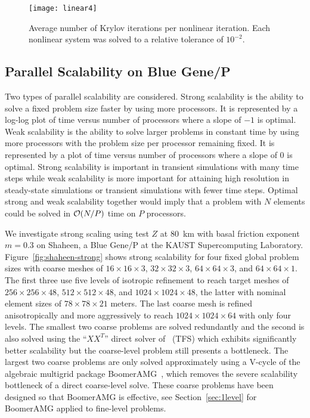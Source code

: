 \begin{figure}
  \centering\texttt{[image: linear4]}
  \caption{Average number of Krylov iterations per nonlinear iteration.  Each nonlinear system was solved to a relative tolerance of $10^{-2}$.}\label{fig:linear}
\end{figure}

\subsection{Parallel Scalability on Blue Gene/P}\label{sec:pscaling}
Two types of parallel scalability are considered.
Strong scalability is the ability to solve a fixed problem size faster by using more processors.
It is represented by a log-log plot of time versus number of processors where a slope of $-1$ is optimal.
Weak scalability is the ability to solve larger problems in constant time by using more processors with the problem size per processor remaining fixed.
It is represented by a plot of time versus number of processors where a slope of $0$ is optimal.
Strong scalability is important in transient simulations with many time steps while weak scalability is more important for attaining high resolution in steady-state simulations or transient simulations with fewer time steps.
Optimal strong and weak scalability together would imply that a problem with $N$ elements could be solved in ${\mathcal{O}}(N/P)$ time on $P$ processors.

We investigate strong scaling using test $Z$ at \SI{80}{\kilo\metre} with basal friction exponent $m= 0.3$ on Shaheen, a Blue Gene/P at the KAUST Supercomputing Laboratory.
Figure~\ref{fig:shaheen-strong} shows strong scalability for four fixed global problem sizes with coarse meshes of $16\times 16\times 3$, $32\times 32\times 3$, $64\times 64\times 3$, and $64\times 64\times 1$.
The first three use five levels of isotropic refinement to reach target meshes of $256\times 256\times 48$, $512\times 512\times 48$, and $1024\times 1024\times 48$, the latter with nominal element sizes of $78\times 78\times 21$ meters.
The last coarse mesh is refined anisotropically and more aggressively to reach $1024\times 1024\times 64$ with only four levels.
The smallest two coarse problems are solved redundantly and the second is also solved using the ``$XX^T$'' direct solver of~\citet{tufo2001fast} (TFS) which exhibits significantly better scalability but the coarse-level problem still presents a bottleneck.
The largest two coarse problems are only solved approximately using a V-cycle of the algebraic multigrid package BoomerAMG~\citep{henson2002bpa}, which removes the severe scalability bottleneck of a direct coarse-level solve.
These coarse problems have been designed so that BoomerAMG is effective, see Section~\ref{sec:1level} for BoomerAMG applied to fine-level problems.

